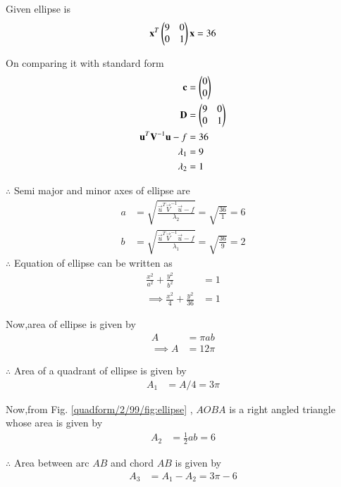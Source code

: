 Given ellipse is 
\begin{align}
    \mathbf{x}^T\begin{pmatrix}9 & 0 \\ 0 & 1\end{pmatrix}\mathbf{x} = 36 
\end{align}

On comparing it with standard form
\begin{align}
    \mathbf{c} &= \begin{pmatrix}0 \\ 0\end{pmatrix}
    \\
    \mathbf{D} &= \begin{pmatrix}9 & 0 \\ 0 & 1\end{pmatrix}
    \\
    \mathbf{u}^T\mathbf{V}^{-1}\mathbf{u} - f &= 36
    \\
    \lambda_1 &= 9 
    \\
    \lambda_2 &= 1
\end{align}

$\therefore$  Semi major and minor axes of ellipse are
\begin{align}
    a &= \sqrt{\frac{ \vec{u}^T\vec{V}^{-1}\vec{u} - f}{\lambda_2}} = \sqrt{\frac{36}{1}} = 6
    \\
    b &= \sqrt{\frac{ \vec{u}^T\vec{V}^{-1}\vec{u} - f}{\lambda_1}} = \sqrt{\frac{36}{9}} = 2
\end{align}
$\therefore$ Equation of ellipse can be written as
\begin{align}
    \frac{x^2}{a^2} + \frac{y^2}{b^2} &= 1
    \\
    \implies \frac{x^2}{4} + \frac{y^2}{36} &= 1
\end{align}

Now,area of ellipse is given by
\begin{align}
    A &= \pi ab
    \\
    \implies A &= 12\pi
\end{align}

$\therefore$ Area of a quadrant of ellipse is given by
\begin{align}
    A_1 &= A/4 = 3\pi
\end{align}

Now,from Fig. \ref{quadform/2/99/fig:ellipse} , $AOBA$ is a right angled triangle whose area is given by 
\begin{align}
    A_2 &= \frac{1}{2}ab = 6
\end{align}

$\therefore$ Area between arc $AB$ and chord $AB$ is given by
\begin{align}
    A_3 &= A_1 - A_2 = 3\pi -6
\end{align}


